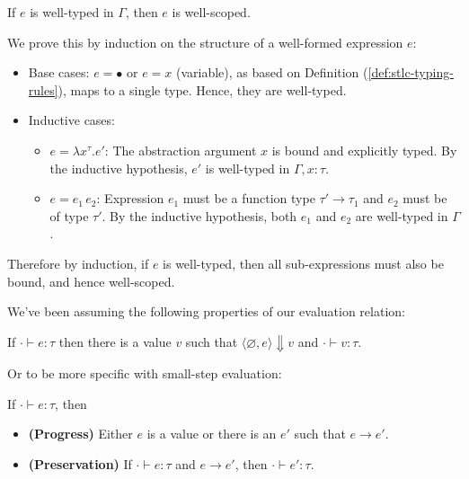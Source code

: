     \begin{theo}

        If $e$ is well-typed in $\Gamma$, then $e$ is well-scoped.
    \end{theo}

    \begin{Proof}

        We prove this by induction on the structure of a well-formed expression $e$:
        \begin{itemize}
            \item Base cases: $e = \bullet$ or $e = x$ (variable), as based on Definition (\ref{def:stlc-typing-rules}), maps to a single type. Hence, they are well-typed.
            \item Inductive cases:
            \begin{itemize}
                \item $e = \lambda x^{\tau}. e'$: The abstraction argument $x$ is bound and explicitly typed. By the inductive hypothesis, $e'$ is well-typed in $\Gamma, x : \tau$.
                \item $e = e_1\, e_2$: Expression $e_1$ must be a function type $\tau' \to \tau_1$ and $e_2$ must be of type $\tau'$. By the inductive hypothesis, both $e_1$ and $e_2$ are well-typed in $\Gamma$.
            \end{itemize}
        \end{itemize}

        \noindent
        Therefore by induction, if $e$ is well-typed, then all sub-expressions must also be bound, and hence well-scoped.
    \end{Proof}
        
    \noindent
    We've been assuming the following properties of our evaluation relation:
    \begin{theo}

        If $\cdot \vdash e : \tau$ then there is a value $v$ such that $\langle \varnothing, e \rangle \Downarrow v$ and $\cdot \vdash v : \tau$.
        \end{theo}
        
        \noindent
        Or to be more specific with small-step evaluation:
    \begin{theo}

    If $\cdot \vdash e : \tau$, then
    \begin{itemize}
        \item \textbf{(Progress)} Either $e$ is a value or there is an $e'$ such that $e \rightarrow e'$.
        \item \textbf{(Preservation)} If $\cdot \vdash e : \tau$ and $e \rightarrow e'$, then $\cdot \vdash e' : \tau$.
    \end{itemize}
    \end{theo}
        
